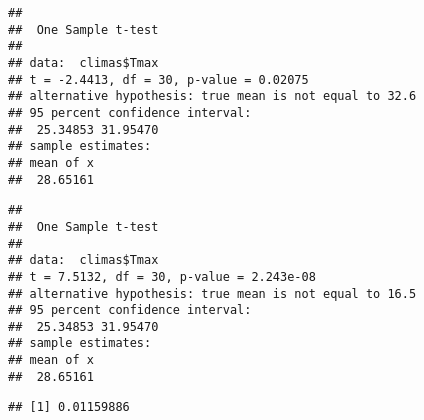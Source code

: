 \documentclass[
]{article}
\newenvironment{Shaded}{\begin{snugshade}}{\end{snugshade}}
\newcommand{\AttributeTok}[1]{\textcolor[rgb]{0.77,0.63,0.00}{#1}}
\newcommand{\CommentTok}[1]{\textcolor[rgb]{0.56,0.35,0.01}{\textit{#1}}}
\newcommand{\DecValTok}[1]{\textcolor[rgb]{0.00,0.00,0.81}{#1}}
\newcommand{\FloatTok}[1]{\textcolor[rgb]{0.00,0.00,0.81}{#1}}
\newcommand{\FunctionTok}[1]{\textcolor[rgb]{0.00,0.00,0.00}{#1}}
\newcommand{\NormalTok}[1]{#1}
\newcommand{\OtherTok}[1]{\textcolor[rgb]{0.56,0.35,0.01}{#1}}
\newcommand{\SpecialCharTok}[1]{\textcolor[rgb]{0.00,0.00,0.00}{#1}}
\begin{document}
\begin{verbatim}
## 
##  One Sample t-test
## 
## data:  climas$Tmax
## t = -2.4413, df = 30, p-value = 0.02075
## alternative hypothesis: true mean is not equal to 32.6
## 95 percent confidence interval:
##  25.34853 31.95470
## sample estimates:
## mean of x 
##  28.65161
\end{verbatim}

\begin{Shaded}
\end{Shaded}

\begin{verbatim}
## 
##  One Sample t-test
## 
## data:  climas$Tmax
## t = 7.5132, df = 30, p-value = 2.243e-08
## alternative hypothesis: true mean is not equal to 16.5
## 95 percent confidence interval:
##  25.34853 31.95470
## sample estimates:
## mean of x 
##  28.65161
\end{verbatim}

\begin{Shaded}
\end{Shaded}

\begin{verbatim}
## [1] 0.01159886
\end{verbatim}

\begin{Shaded}
\end{Shaded}
\end{document}
